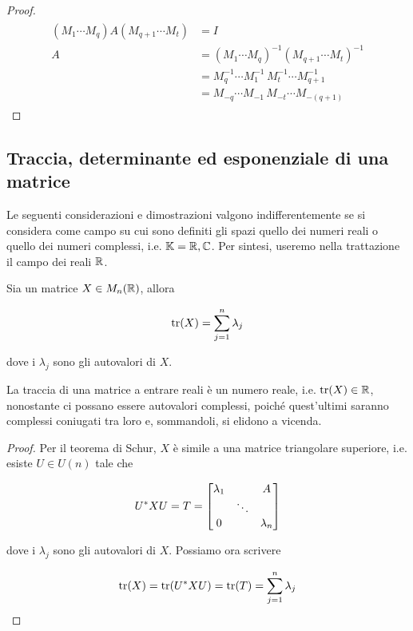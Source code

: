 \begin{proof}
	\begin{align}
		\begin{split}
			(M_{1} \cdots M_{q}) A (M_{q+1} \cdots M_{t}) &= I \\
			A &= (M_{1} \cdots M_{q})^{-1} (M_{q+1} \cdots M_{t})^{-1} \\
			&= M_{q}^{-1} \cdots M_{1}^{-1} \, M_{t}^{-1} \cdots M_{q+1}^{-1} \\
			&= M_{-q} \cdots M_{-1} \, M_{-t} \cdots M_{-(q+1)}
		\end{split}
	\end{align}
\end{proof}

\subsection{Traccia, determinante ed esponenziale di una matrice}

Le seguenti considerazioni e dimostrazioni valgono indifferentemente se si considera come campo su cui sono definiti gli spazi quello dei numeri reali o quello dei numeri complessi, i.e. $ \mathbb{K} = \mathbb{R},\mathbb{C} $. Per sintesi, useremo nella trattazione il campo dei reali $ \mathbb{R} $.

\begin{definition}
	Sia un matrice $ X \in M_{n}(\mathbb{R}) $, allora
	
	\begin{equation}
		\tr(X) = \sum_{j=1}^{n} \lambda_{j}
	\end{equation}
	
	dove i $ \lambda_{j} $ sono gli autovalori di $ X $.
\end{definition}

La traccia di una matrice a entrare reali è un numero reale, i.e. $ \tr(X) \in \mathbb{R} $, nonostante ci possano essere autovalori complessi, poiché quest'ultimi saranno complessi coniugati tra loro e, sommandoli, si elidono a vicenda.

\begin{proof}
	Per il teorema di Schur, $ X $ è simile a una matrice triangolare superiore, i.e. esiste $ U \in U(n) $ tale che
	
	\begin{equation}
		U^{*} X U = T = %
		\bmqty{ %
				\lambda_{1}	& & A \\
				& \ddots & \\
				0 & & \lambda_{n} %
				}
	\end{equation}
	
	dove i $ \lambda_{j} $ sono gli autovalori di $ X $. Possiamo ora scrivere
	
	\begin{equation}
		\tr(X) = \tr(U^{*} X U) %
		= \tr(T) %
		= \sum_{j=1}^{n} \lambda_{j}
	\end{equation}
\end{proof}

